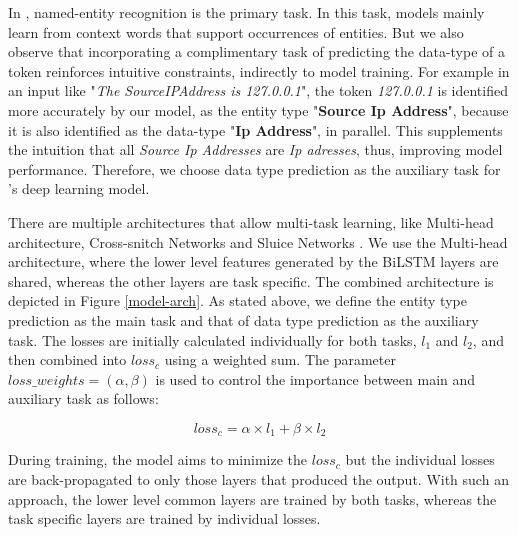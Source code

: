 In \softner{}, named-entity recognition is the primary task. In this task, models mainly learn from context words that support occurrences of entities. But we also observe that incorporating a complimentary task of predicting the data-type of a token reinforces intuitive constraints, indirectly to model training. For example in an input like "\textit{The SourceIPAddress is 127.0.0.1}", the token \textit{127.0.0.1} is identified more accurately by our model, as the entity type "\textbf{Source Ip Address}", because it is also identified as the data-type "\textbf{Ip Address}", in parallel. This supplements the intuition that all \textit{Source Ip Addresses} are \textit{Ip adresses}, thus, improving model performance. Therefore, we choose data type prediction as the auxiliary task for \softner{}'s deep learning model.

There are multiple architectures that allow multi-task learning, like Multi-head architecture, Cross-snitch Networks\cite{misra2016cross} and Sluice Networks \cite{ruder2017learning}. We use the Multi-head architecture, where the lower level features generated by the BiLSTM layers are shared, whereas the other layers are task specific. The combined architecture is depicted in Figure \ref{model-arch}. As stated above, we define the entity type prediction as the main task and that of data type prediction as the auxiliary task. The losses are initially calculated individually for both tasks, $l_1$ and $l_2$, and then combined into $loss_{c}$ using a weighted sum. The parameter $loss\_weights = (\alpha,\beta)$ is used to control the importance between main and auxiliary task as follows:

\begin{equation}
    loss_{c} = \alpha \times l_1 + \beta \times l_2
\end{equation}

During training, the model aims to minimize the $loss_{c}$ but the individual losses are back-propagated to only those layers that produced the output. With such an approach, the lower level common layers are trained by both tasks, whereas the task specific layers are trained by individual losses.